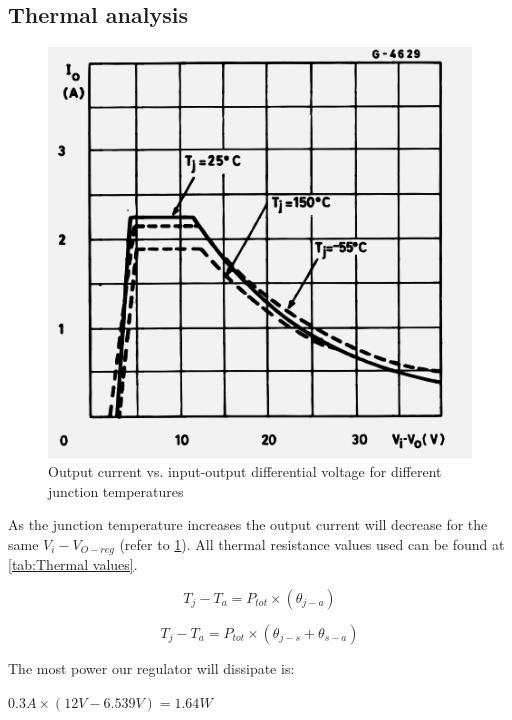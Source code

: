 \subsection{Thermal analysis}
\begin{figure}
\centering
\includegraphics[scale=0.2]{Figures/temp.png}
\caption[{Output current vs. input-output
differential voltage for different junction temperatures}]{Output current vs. input-output
differential voltage for different junction temperatures\cite{STM}}
\label{fig:temp}
\end{figure}

As the junction temperature increases the output current will decrease for the same $V_i-V_{O-reg}$\cite{STM} (refer to \ref{fig:temp}). All thermal resistance values used can be found at \ref{tab:Thermal values}.



\begin{equation}
    T_j-T_a=P_{tot}\times(\theta_{j-a})
    \label{eq:woSink}
\end{equation}

\begin{equation}
    T_j-T_a=P_{tot}\times(\theta_{j-s}+\theta_{s-a})
    \label{eq:wSink}
\end{equation}

The most power our regulator will dissipate is:
\begin{center}
    $0.3A\times(12V-6.539V)=1.64W$
\end{center}


